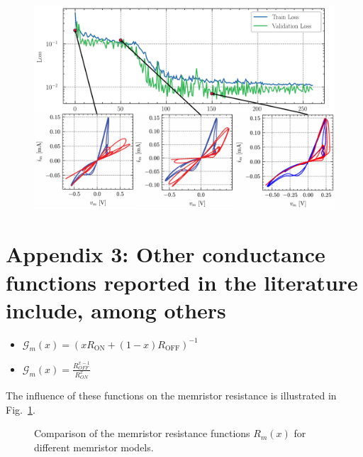\documentclass[11pt, oneside]{article}
\newcommand{\G}{\mathcal{G}}
\begin{document}
\begin{figure}[H]
    \centering
    \includegraphics[width=0.8\linewidth]{figs/Training_process.pdf}
    \caption*{}
\end{figure}


\section*{Appendix 3: Other conductance functions reported in the literature include, among others}
\begin{itemize}
    \item $\G_m(x) = \left( x R_{\mathrm{ON}} + (1 - x) R_{\mathrm{OFF}} \right)^{-1}$
    \item $\G_m(x) = \frac{R_{OFF}^{x-1}}{R_{ON}^x}$
\end{itemize}

The influence of these functions on the memristor resistance is illustrated in Fig.~\ref{fig:m-x}.

\begin{figure}[H]
    \centering
    \resizebox{0.5\linewidth}{!}{%
        
    }
    \caption{Comparison of the memristor resistance functions $R_m(x)$ for different memristor models.}
    \label{fig:m-x}
\end{figure}

\printbibliography[heading=bibintoc]
\end{document}

